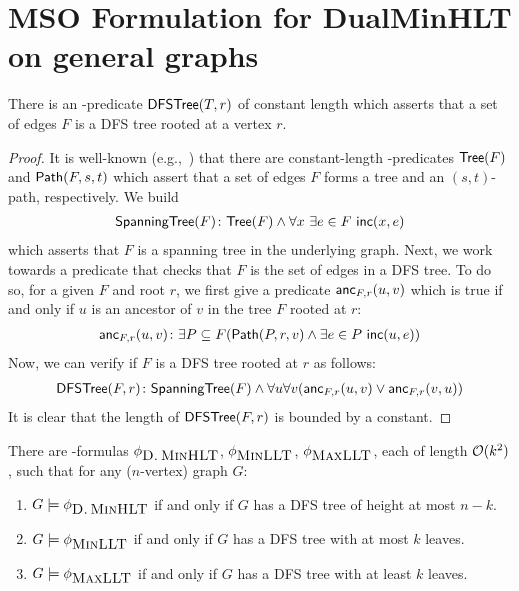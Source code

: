 \documentclass[a4paper,11pt]{article}
\begin{document}
%
\newcommand\msoDFSTree{\mso{DFSTree}\xspace}
% 
\section{MSO Formulation for DualMinHLT on general graphs}\label{sectn:courcelle-dualhlt}
%
\begin{lemma}\label{lem:msoDFSTree}
    There is an \MSOtwo-predicate $\msoDFSTree(T, r)$ of constant length
    which asserts that a set of edges $F$ is a DFS tree rooted at a vertex $r$.
\end{lemma}
\begin{proof}
    It is well-known (e.g.,~\cite{BoriePT92})%
    that there are  constant-length \MSOtwo-predicates $\mathsf{Tree}(F)$
    and $\mathsf{Path}(F, s, t)$
    which assert that a set of edges $F$ forms a tree and an $(s, t)$-path, respectively.
    We build
    \begin{align*}
        \mathsf{SpanningTree}(F) \colon \mathsf{Tree}(F) \land 
        \forall x~\exists e \in F ~\mathsf{inc}(x, e)
    \end{align*}
    which asserts that $F$ is a spanning tree in the underlying graph.
    Next, we work towards a predicate that checks that $F$ is the set of edges in a DFS tree.
    To do so, for a given $F$ and root $r$, 
    we first 
    give a predicate $\mathsf{anc}_{F, r}(u, v)$
    which is true if and only if $u$ is an ancestor of $v$ in the tree $F$ rooted at $r$:
    \begin{align*}
        \mathsf{anc}_{F, r}(u, v) \colon \exists P \subseteq F
            (\mathsf{Path}(P, r, v) \land \exists e \in P~ \mathsf{inc}(u, e))
    \end{align*}
    Now, we can verify if $F$ is a DFS tree rooted at $r$ as follows:
    \begin{align*}
        \msoDFSTree(F, r) \colon \mso{SpanningTree}(F) \land \forall u \forall v 
        (\mso{anc}_{F, r}(u, v) \lor \mso{anc}_{F, r}(v, u))
    \end{align*}
    It is clear that the length of $\msoDFSTree(F, r)$ is bounded by a constant.
\end{proof}
%
%
%
\newcommand\msoProbName[1]{\ensuremath{\phi_{\mbox{\textsc{#1}}}}\xspace}
\newcommand\msoDualMinLT{\msoProbName{D.\,MinHLT}}
\newcommand\msoMinLLT{\msoProbName{MinLLT}}
\newcommand\msoMaxLLT{\msoProbName{MaxLLT}}
\begin{lemma}\label{lem:mso:problems}
    There are \MSOtwo-formulas $\msoDualMinLT$, $\msoMinLLT$, $\msoMaxLLT$, 
    each of length ${\mathcal{O}}(k^2)$, 
    such that for any ($n$-vertex) graph $G$:
    \begin{enumerate}
        \item\label{enum:mso:DualMinLT}
        $G \models \msoDualMinLT$ if and only if $G$ has a DFS tree of height at most $n - k$.
        \item\label{enum:mso:MinLLT} 
        $G \models \msoMinLLT$ if and only if $G$ has a DFS tree with at most $k$ leaves. 
        \item\label{enum:mso:MaxLLT} 
        $G \models \msoMaxLLT$ if and only if $G$ has a DFS tree with at least $k$ leaves. 
    \end{enumerate}
\end{lemma}
\end{document}
